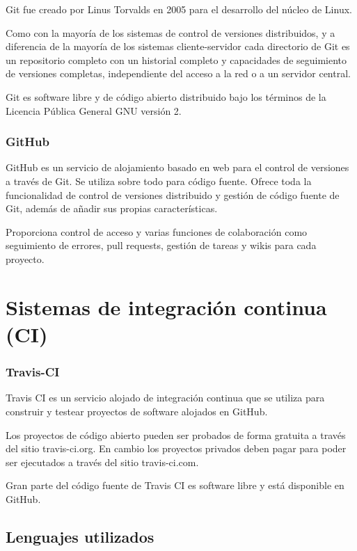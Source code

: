 Git fue creado por Linus Torvalds en 2005 para el desarrollo del núcleo de Linux.

Como con la mayoría de los sistemas de control de versiones distribuidos, y a diferencia de la mayoría de los sistemas cliente-servidor cada directorio de Git es un repositorio completo con un historial completo y capacidades de seguimiento de versiones completas, independiente del acceso a la red o a un servidor central.

Git es software libre y de código abierto distribuido bajo los términos de la Licencia Pública General GNU versión 2.

\subsubsection {GitHub}

GitHub es un servicio de alojamiento basado en web para el control de versiones a través de Git. Se utiliza sobre todo para código fuente. Ofrece toda la funcionalidad de control de versiones distribuido y gestión de código fuente de Git, además de añadir sus propias características.

Proporciona control de acceso y varias funciones de colaboración como seguimiento de errores, pull requests, gestión de tareas y wikis para cada proyecto.


\section {Sistemas de integración continua (CI)}

\subsubsection {Travis-CI}

Travis CI es un servicio alojado de integración continua que se utiliza para construir y testear proyectos de software alojados en GitHub.

Los proyectos de código abierto pueden ser probados de forma gratuita a través del sitio travis-ci.org. En cambio los proyectos privados deben pagar para poder ser ejecutados a través del sitio travis-ci.com.

Gran parte del código fuente de Travis CI es software libre y está disponible en GitHub.

\subsection{Lenguajes utilizados}

